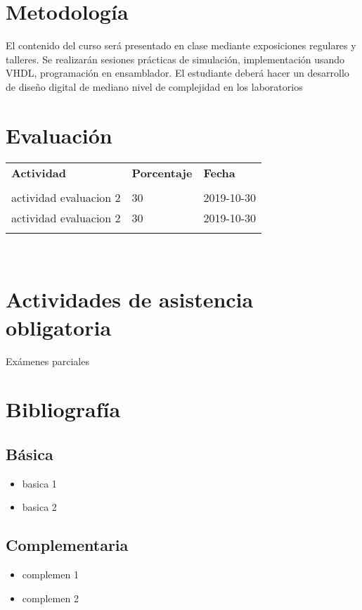 \documentclass[11pt]{article}
\begin{document}
\section*{Metodología}

El contenido del curso será presentado en clase mediante exposiciones regulares y talleres. Se realizarán sesiones prácticas de simulación, implementación usando VHDL, programación en ensamblador. El estudiante deberá hacer un desarrollo de diseño digital de mediano nivel de complejidad en los laboratorios

\section*{Evaluación}
\noindent \begin{tabular}{R{0.5\textwidth} C{0.2\textwidth} C{0.2\textwidth}}
	\toprule
	\textbf{Actividad} & \textbf{Porcentaje} & \textbf{Fecha} \\
	\\
	\midrule
	actividad evaluacion 2 & 30 & 2019-10-30 \\ actividad evaluacion 2 & 30 & 2019-10-30 \\ 
	\\
	\midrule
\end{tabular}
\\
\section*{Actividades de asistencia obligatoria}

Exámenes parciales

\section*{Bibliografía}

\subsection*{Básica}

\begin{itemize}
\item basica 1  \item  basica 2  
\end{itemize}

\subsection*{Complementaria}

\begin{itemize}
\item complemen 1  \item  complemen 2  
\end{itemize}
\end{document}
